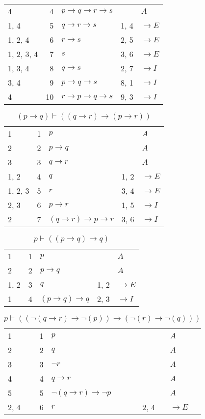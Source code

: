 \documentclass{article}
\begin{document}
\begin{table}[htbp]
\begin{tabular}{lrlll}
{4} & 4 & $p→q→r→s$ & {} & $A$ \\
{1, 4} & 5 & $q→r→s$ & {1, 4} & $→E$ \\
{1, 2, 4} & 6 & $r→s$ & {2, 5} & $→E$ \\
{1, 2, 3, 4} & 7 & $s$ & {3, 6} & $→E$ \\
{1, 3, 4} & 8 & $q→s$ & {2, 7} & $→I$ \\
{3, 4} & 9 & $p→q→s$ & {8, 1} & $→I$ \\
{4} & 10 & $r→p→q→s$ & {9, 3} & $→I$ \\
\end{tabular}
\end{table}\begin{table}[htbp]\caption*{$(p → q) ⊢ ((q → r) → (p → r))$}\centering\begin{tabular}{lrlll}
{1} & 1 & $p$ & {} & $A$ \\
{2} & 2 & $p→q$ & {} & $A$ \\
{3} & 3 & $q→r$ & {} & $A$ \\
{1, 2} & 4 & $q$ & {1, 2} & $→E$ \\
{1, 2, 3} & 5 & $r$ & {3, 4} & $→E$ \\
{2, 3} & 6 & $p→r$ & {1, 5} & $→I$ \\
{2} & 7 & $(q→r)→p→r$ & {3, 6} & $→I$ \\
\end{tabular}
\end{table}\begin{table}[htbp]\caption*{$p ⊢ ((p → q) → q)$}\centering\begin{tabular}{lrlll}
{1} & 1 & $p$ & {} & $A$ \\
{2} & 2 & $p→q$ & {} & $A$ \\
{1, 2} & 3 & $q$ & {1, 2} & $→E$ \\
{1} & 4 & $(p→q)→q$ & {2, 3} & $→I$ \\
\end{tabular}
\end{table}\begin{table}[htbp]\caption*{$p ⊢ ((¬(q→r)→ ¬(p))→ (¬(r)→ ¬(q)))$}\centering\begin{tabular}{lrlll}
{1} & 1 & $p$ & {} & $A$ \\
{2} & 2 & $q$ & {} & $A$ \\
{3} & 3 & $¬r$ & {} & $A$ \\
{4} & 4 & $q→r$ & {} & $A$ \\
{5} & 5 & $¬ (q→r)→ ¬p$ & {} & $A$ \\
{2, 4} & 6 & $r$ & {2, 4} & $→E$ \\

\end{tabular}
\end{table}
\end{document}
